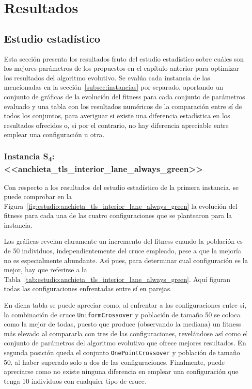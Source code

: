\chapter{Resultados}
\label{cap:4-resultados}

\section{Estudio estadístico}

Esta sección presenta los resultados fruto del estudio estadístico sobre cuáles son los mejores parámetros de los propuestos en el capítulo anterior para optimizar los resultados del algoritmo evolutivo. Se evalúa cada instancia de las mencionadas en la sección~\ref{subsec:instancias} por separado, aportando un conjunto de gráficas de la evolución del fitness para cada conjunto de parámetros evaluado y una tabla con los resultados numéricos de la comparación entre sí de todos los conjuntos, para averiguar si existe una diferencia estadística en los resultados ofrecidos o, si por el contrario, no hay diferencia apreciable entre emplear una configuración u otra.

\subsection{Instancia S\textsubscript{4}: <<anchieta\_tls\_interior\_lane\_always\_green>>}


Con respecto a los resultados del estudio estadístico de la primera instancia, se puede comprobar en la Figura~\ref{fig:estudio:anchieta_tls_interior_lane_always_green} la evolución del fitness para cada una de las cuatro configuraciones que se plantearon para la instancia. 

Las gráficas revelan claramente un incremento del fitness cuando la población es de 50 individuos, independientemente del cruce empleado, pese a que la mejoría no es especialmente abundante. Así pues, para determinar cual configuración es la mejor, hay que referirse a la Tabla~\ref{tab:estudio:anchieta_tls_interior_lane_always_green}. Aquí figuran todas las configuraciones enfrentadas entre sí en parejas.

En dicha tabla se puede apreciar como, al enfrentar a las configuraciones entre sí, la combinación de cruce \texttt{UniformCrossover} y población de tamaño 50 se coloca como la mejor de todas, puesto que produce (observando la mediana) un fitness más elevado al compararla con tres de las configuraciones, revelándose así como el conjunto de parámetros del algoritmo evolutivo que ofrece mejores resultados. En segunda posición queda el conjunto \texttt{OnePointCrossover} y población de tamaño 50, al haber superado solo a dos de las configuraciones. Finalmente, puede apreciarse como no existe ninguna diferencia en emplear una configuración que tenga 10 individuos con cualquier tipo de cruce.


